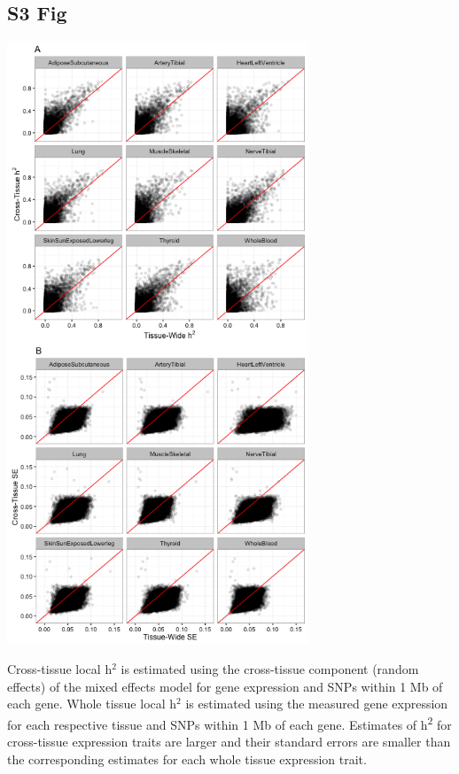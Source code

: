 \documentclass[10pt,letterpaper]{article}
\begin{document}
\begin{singlespace}
\subsection*{S3 Fig}
\includegraphics[width=9cm]{Figures/GenArch_Supp/S3Fig.png}
\label{S3_Fig}

 Cross-tissue local h$^2$ is estimated using the cross-tissue component (random effects) of the mixed effects model for gene expression and SNPs within 1 Mb of each gene. Whole tissue local h$^2$ is estimated using the measured gene expression for each respective tissue and SNPs within 1 Mb of each gene. Estimates of h\textsuperscript{2} for cross-tissue expression traits are larger and their standard errors are smaller than the corresponding estimates for each whole tissue expression trait.


\end{singlespace}
\end{document}
